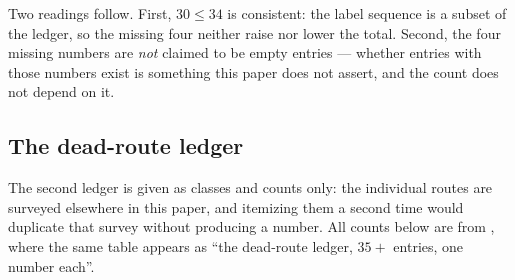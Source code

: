 \noindent Two readings follow. First, $30\le34$ is consistent: the label sequence is a subset of the
ledger, so the missing four neither raise nor lower the total. Second, the four missing numbers are
\emph{not} claimed to be empty entries --- whether entries with those numbers exist is something this
paper does not assert, and the count does not depend on it.

\subsection{The dead-route ledger}\label{sec:ledger-dead}

The second ledger is given as classes and counts only: the individual routes are surveyed elsewhere in
this paper, and itemizing them a second time would duplicate that survey without producing a number. All
counts below are from , where the same table appears as ``the
dead-route ledger, $35+$ entries, one number each''.

